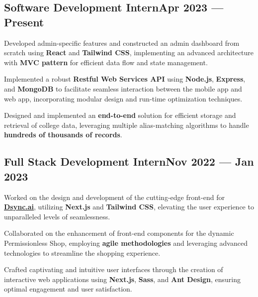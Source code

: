 \subsection{{Software Development Intern\hfill Apr 2023 --- Present}}
\begin{zitemize}
\item Developed admin-specific features and constructed an admin dashboard from scratch using \textbf{React} and \textbf{Tailwind CSS}, implementing an advanced architecture with \textbf{MVC pattern} for efficient data flow and state management.
\item Implemented a robust \textbf{Restful Web Services API} using \textbf{Node.js}, \textbf{Express}, and \textbf{MongoDB} to facilitate seamless interaction between the mobile app and web app, incorporating modular design and run-time optimization techniques.
\item Designed and implemented an \textbf{end-to-end} solution for efficient storage and retrieval of college data, leveraging multiple alias-matching algorithms to handle \textbf{hundreds of thousands of records}.
\end{zitemize}

\subsection{{Full Stack Development Intern\hfill Nov 2022 --- Jan 2023}}
\begin{zitemize}
\item Worked on the design and development of the cutting-edge front-end for \textbf{\href{https://dsync.ai}{Dsync.ai}}, utilizing \textbf{Next.js} and \textbf{Tailwind CSS}, elevating the user experience to unparalleled levels of seamlessness.
\item Collaborated on the enhancement of front-end components for the dynamic Permissionless Shop, employing \textbf{agile methodologies} and leveraging advanced technologies to streamline the shopping experience.
\item Crafted captivating and intuitive user interfaces through the creation of interactive web applications using \textbf{Next.js}, \textbf{Sass}, and \textbf{Ant Design}, ensuring optimal engagement and user satisfaction.
\end{zitemize}

